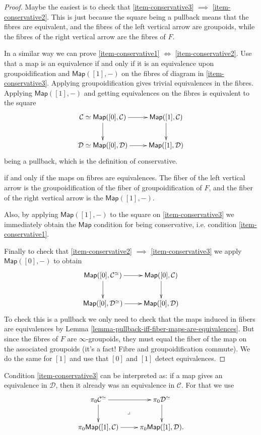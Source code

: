 \begin{proof}
Maybe the easiest is to check that 
\ref{item-conservative3} $\implies$ \ref{item-conservative2}.
This is just because the square being a pullback
means that the fibres are equivalent,
and the fibres of the left vertical arrow are
groupoids, while the fibres of the right vertical
arrow are the fibres of $F$.

In a similar way we can prove
\ref{item-conservative1} $\iff$ \ref{item-conservative2}.
Use that a map is an equivalence if and only if it is 
an equivalence upon groupoidification and $\mathsf{Map}([1],-)$ 
on the fibres of diagram in \ref{item-conservative3}.
Applying groupoidification gives
trivial equivalences in the fibres.
Applying $\mathsf{Map}([1],-)$ and getting
equivalences on the fibres is equivalent to
the square
$$
\xymatrix{
\mathcal{C}\simeq\mathsf{Map}([0],\mathcal{C})
\ar[r]\ar[d]&
\mathsf{Map}([1],\mathcal{C})\ar[d]\\
\mathcal{D}\simeq \mathsf{Map}([0],\mathcal{D})\ar[r]&
\mathsf{Map}([1],\mathcal{D})
}
$$
being a pullback, which is the definition of conservative.

if and only if the maps on fibres
are equivalences. The fiber of the left vertical arrow
is the groupoidification of the fiber of groupoidification of $F$,
and the fiber of the right vertical arrow
is the $\mathsf{Map}([1],-)$.

Also, by applying $\mathsf{Map}([1],-)$ to
the square on \ref{item-conservative3}
we immediately obtain the $\mathsf{Map}$ condition
for being conservative, i.e. condition \ref{item-conservative1}.

Finally to check that
\ref{item-conservative2} $\implies$ \ref{item-conservative3} 
we apply $\mathsf{Map}([0],-)$ to obtain
$$
\xymatrix{
\mathsf{Map}([0],\mathcal{C}^\simeq)\ar[r]\ar[d]
&\mathsf{Map}([0],\mathcal{C})\ar[d]\\
\mathsf{Map}([0],\mathcal{D}^{\simeq})\ar[r]&\mathsf{Map}([0],\mathcal{D})
}
$$
To check this is a pullback we only need to
check that the maps induced in fibers are equivalences
by  Lemma \ref{lemma-pullback-iff-fiber-maps-are-equivalences}.
But since the fibres of $F$ are $\infty$-groupoids,
they must equal the fiber of the map on the associated groupoids
(it's a fact! Fibre and groupoidification commute).
We do the same for $[1]$ and use that $[0]$ and $[1]$ detect
equivalences.
\end{proof}

Condition \ref{item-conservative3}
can be interpreted as:
if a map gives an equivalence in $\mathcal{D}$,
then it already was an equivalence in $\mathcal{C}$.
For that we use
$$
\xymatrix{
\pi_0\mathcal{C}^\simeq\ar[r]\ar[d]\ar@{}[dr]|-{\lrcorner}&
\pi_0\mathcal{D}^\simeq\ar[d]\\
\pi_0\mathsf{Map}([1],\mathcal{C})\ar[r]&
\pi_0\mathsf{Map}([1],\mathcal{D}).
}
$$

